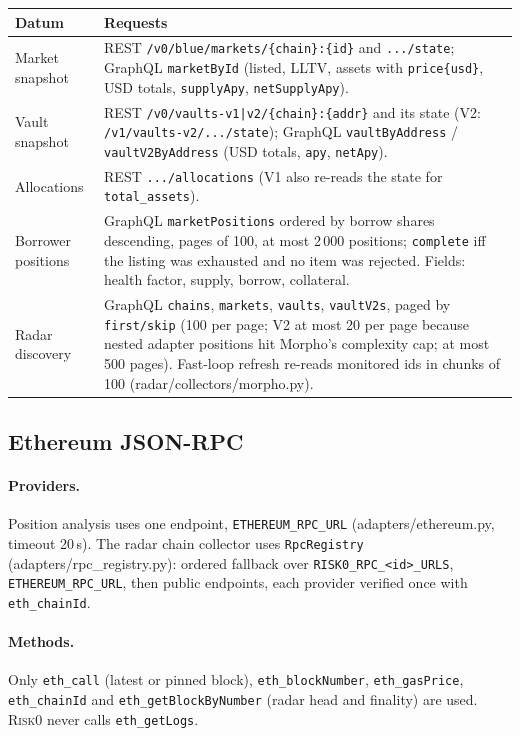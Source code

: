\documentclass[11pt,a4paper]{article}
\newcommand{\RiskZero}{\textsc{Risk0}}
\newcommand{\code}[1]{\texttt{#1}}
\newcommand{\src}[1]{\textsf{\small #1}}
\begin{document}
\begin{center}\small
\begin{tabularx}{\textwidth}{@{}L{3.2cm}Y@{}}
\toprule
Datum & Requests \\
\midrule
Market snapshot & REST \code{/v0/blue/markets/\{chain\}:\{id\}} and \code{.../state}; GraphQL \code{marketById} (listed, LLTV, assets with \code{price\{usd\}}, USD totals, \code{supplyApy}, \code{netSupplyApy}). \\
Vault snapshot & REST \code{/v0/vaults-v1|v2/\{chain\}:\{addr\}} and its state (V2: \code{/v1/vaults-v2/.../state}); GraphQL \code{vaultByAddress} / \code{vaultV2ByAddress} (USD totals, \code{apy}, \code{netApy}). \\
Allocations & REST \code{.../allocations} (V1 also re-reads the state for \code{total\_assets}). \\
Borrower positions & GraphQL \code{marketPositions} ordered by borrow shares descending, pages of 100, at most 2\,000 positions; \code{complete} iff the listing was exhausted and no item was rejected. Fields: health factor, supply, borrow, collateral. \\
Radar discovery & GraphQL \code{chains}, \code{markets}, \code{vaults}, \code{vaultV2s}, paged by \code{first/skip} (100 per page; V2 at most 20 per page because nested adapter positions hit Morpho's complexity cap; at most 500 pages). Fast-loop refresh re-reads monitored ids in chunks of 100 (\src{radar/collectors/morpho.py}). \\
\bottomrule
\end{tabularx}
\end{center}

\subsection{Ethereum JSON-RPC}\label{sec:rpc}

\paragraph{Providers.} Position analysis uses one endpoint,
\code{ETHEREUM\_RPC\_URL} (\src{adapters/ethereum.py}, timeout 20\,s). The radar
chain collector uses \code{RpcRegistry} (\src{adapters/rpc\_registry.py}):
ordered fallback over \code{RISK0\_RPC\_<id>\_URLS}, \code{ETHEREUM\_RPC\_URL},
then public endpoints, each provider verified once with \code{eth\_chainId}.

\paragraph{Methods.} Only \code{eth\_call} (latest or pinned block),
\code{eth\_blockNumber}, \code{eth\_gasPrice}, \code{eth\_chainId} and
\code{eth\_getBlockByNumber} (radar head and finality) are used. \RiskZero{}
never calls \code{eth\_getLogs}.
\end{document}
